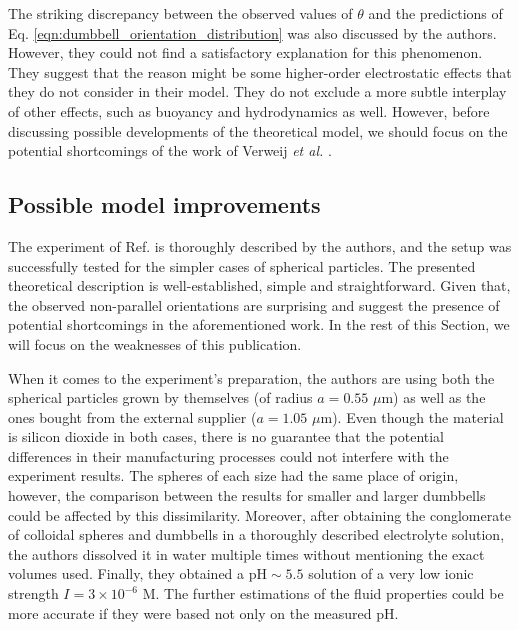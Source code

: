 \documentclass{master_thesis}
\begin{document}
The striking discrepancy between the observed values of $\theta$ and the predictions of Eq. \eqref{eqn:dumbbell_orientation_distribution} was also discussed by the authors. However, they could not find a satisfactory explanation for this phenomenon. They suggest that the reason might be some higher-order electrostatic effects that they do not consider in their model. They do not exclude a more subtle interplay of other effects, such as buoyancy and hydrodynamics as well. However, before discussing possible developments of the theoretical model, we should focus on the potential shortcomings of the work of Verweij \textit{et al.} \cite{verweij2021}.


\subsection{Possible model improvements} \label{sec:shortcomings}

The experiment of Ref. \cite{verweij2021} is thoroughly described by the authors, and the setup was successfully tested for the simpler cases of spherical particles. The presented theoretical description is well-established, simple and straightforward. Given that, the observed non-parallel orientations are surprising and suggest the presence of potential shortcomings in the aforementioned work. In the rest of this Section, we will focus on the weaknesses of this publication.

When it comes to the experiment's preparation, the authors are using both the spherical particles grown by themselves (of radius $a=0.55$ $\mu$m) as well as the ones bought from the external supplier ($a=1.05$ $\mu$m). Even though the material is silicon dioxide in both cases, there is no guarantee that the potential differences in their manufacturing processes could not interfere with the experiment results. The spheres of each size had the same place of origin, however, the comparison between the results for smaller and larger dumbbells could be affected by this dissimilarity. Moreover, after obtaining the conglomerate of colloidal spheres and dumbbells in a thoroughly described electrolyte solution, the authors dissolved it in water multiple times without mentioning the exact volumes used. Finally, they obtained a $\textrm{pH} \sim 5.5$ solution of a very low ionic strength $I=3\times 10^{-6}$ M. The further estimations of the fluid properties could be more accurate if they were based not only on the measured $\textrm{pH}$.
\end{document}
